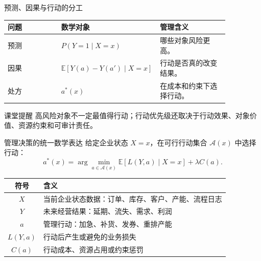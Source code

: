 \documentclass[UTF8,fontset=fandol,aspectratio=169,11pt]{ctexbeamer}
\begin{document}
\begin{frame}{预测、因果与行动的分工}
\begin{table}
\small
\centering
\begin{tabular}{p{0.24\linewidth}p{0.31\linewidth}p{0.31\linewidth}}
\toprule
问题 & 数学对象 & 管理含义\\
\midrule
预测 & \(P(Y=1\mid X=x)\) & 哪些对象风险更高。\\
因果 & \(\mathbb E[Y(a)-Y(a')\mid X=x]\) & 行动是否真的改变结果。\\
处方 & \(a^*(x)\) & 在成本和约束下选择行动。\\
\bottomrule
\end{tabular}
\end{table}

\begin{alertblock}{课堂提醒}
高风险对象不一定最值得行动；行动优先级还取决于行动效果、对象价值、资源约束和可审计责任。
\end{alertblock}
\end{frame}

\begin{frame}{管理决策的统一数学表达}
给定企业状态 \(X=x\)，在可行行动集合 \(\mathcal A(x)\) 中选择行动：
\[
a^*(x)
=
\arg\min_{a\in\mathcal A(x)}
\mathbb E\!\left[L(Y,a)\mid X=x\right]
+
\lambda C(a).
\]

\begin{table}
\small
\centering
\begin{tabular}{cl}
\toprule
符号 & 含义\\
\midrule
\(X\) & 当前企业状态数据：订单、库存、客户、产能、流程日志\\
\(Y\) & 未来经营结果：延期、流失、需求、利润\\
\(a\) & 管理行动：加急、补货、发券、重排产能\\
\(L(Y,a)\) & 行动后产生或避免的业务损失\\
\(C(a)\) & 行动成本、资源占用或约束惩罚\\
\bottomrule
\end{tabular}
\end{table}
\end{frame}
\end{document}

